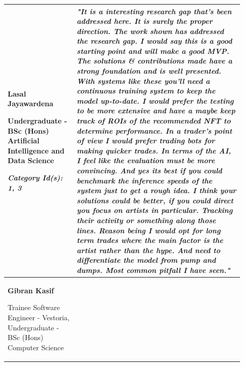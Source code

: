 \begin{longtable}{|p{0.27\linewidth}|p{0.655\linewidth}|}
\hline
\textbf{Lasal Jayawardena}

Undergraduate - BSc (Hons) Artificial Intelligence and Data Science

\textit{Category Id(s): 1, 3}
 & 
 \textit{"It is a interesting research gap that's been addressed here. It is surely the proper direction. The work shown has addressed the research gap. I would say this is a good starting point and will make a good MVP. The solutions \& contributions made have a strong foundation and is well presented. With systems like these you'll need a continuous training system to keep the model up-to-date. I would prefer the testing to be more extensive and have a maybe keep track of ROIs of the recommended NFT to determine performance.
 In a trader's point of view I would prefer trading bots for making quicker trades. In terms of the AI, I feel like the evaluation must be more convincing. And yes its best if you could benchmark the inference speeds of the system just to get a rough idea. 
I think your solutions could be better, if you could direct you focus on artists in particular. Tracking their activity or something along those lines. Reason being I would opt for long term trades where the main factor is the artist rather than the hype. And need to differentiate the model from pump and dumps. Most common pitfall I have seen."}
 \\
\hline
\textbf{Gibran Kasif}

Trainee Software Engineer - Vestoria,
Undergraduate - BSc (Hons) Computer Science


\end{longtable}
